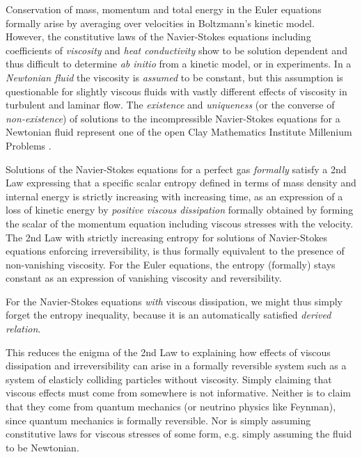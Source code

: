 Conservation of mass, momentum and total energy in the  
Euler equations formally arise by averaging over velocities in 
Boltzmann's kinetic model. However, the constitutive laws of the 
Navier-Stokes equations including coefficients of 
\emph{viscosity} and \emph{heat conductivity} show to be 
solution dependent and thus difficult to determine \emph{ab initio}
from a kinetic model, or in experiments.
In a \emph{Newtonian fluid} the viscosity is \emph{assumed}
to be constant, but this assumption is questionable 
for slightly viscous fluids with vastly different
effects of viscosity in turbulent and laminar flow.
The \emph{existence} and \emph{uniqueness} (or the converse
of \emph{non-existence}) of solutions to the incompressible 
Navier-Stokes equations for a Newtonian fluid represent one of 
the open Clay Mathematics Institute Millenium Problems 
\cite{clay}.   


Solutions of the Navier-Stokes equations for a perfect gas \emph{formally} 
satisfy a 2nd Law  expressing that a specific scalar entropy defined in 
terms of mass density and internal energy is strictly increasing with increasing
time, as an expression of a loss of kinetic energy by 
\emph{positive viscous dissipation} formally obtained 
by forming the scalar of the momentum equation including
viscous stresses with the velocity. 
The 2nd Law with strictly increasing entropy for 
solutions of Navier-Stokes equations enforcing irreversibility, is thus
formally equivalent to the presence of non-vanishing viscosity.
For the Euler equations, the entropy (formally) stays constant as an expression
of vanishing viscosity and reversibility.

For the Navier-Stokes equations \emph{with} viscous dissipation,
we might thus simply forget the entropy inequality, because it is 
an automatically satisfied \emph{derived relation}. 
 
This reduces the enigma of the 2nd Law to explaining how effects of 
viscous dissipation and irreversibility can arise in a formally reversible
system such as a system of elasticly colliding particles without viscosity. 
Simply claiming that viscous effects must come from 
somewhere is not informative. Neither is to claim that they come from
quantum mechanics (or neutrino physics like Feynman), since quantum 
mechanics is formally reversible. Nor is simply assuming 
constitutive laws for viscous stresses of some form, e.g. 
simply assuming the fluid to be Newtonian. 

